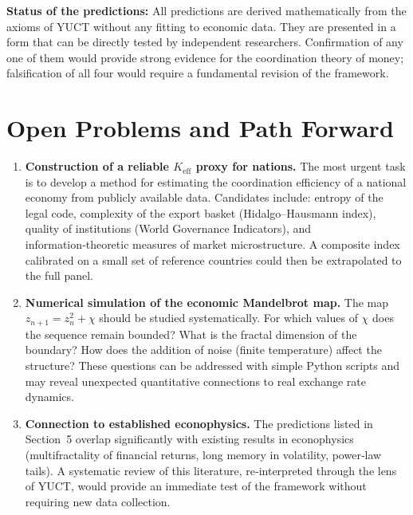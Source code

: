 \documentclass[12pt,a4paper]{article}
\theoremstyle{remark}
\begin{document}
	\textbf{Status of the predictions:} All predictions are derived mathematically from the axioms of YUCT without any fitting to economic data. They are presented in a form that can be directly tested by independent researchers. Confirmation of any one of them would provide strong evidence for the coordination theory of money; falsification of all four would require a fundamental revision of the framework.
	
	\section{Open Problems and Path Forward}
	
	\begin{enumerate}[label=(\roman*)]
		\item \textbf{Construction of a reliable \(K_{\mathrm{eff}}\) proxy for nations.} The most urgent task is to develop a method for estimating the coordination efficiency of a national economy from publicly available data. Candidates include: entropy of the legal code, complexity of the export basket (Hidalgo–Hausmann index), quality of institutions (World Governance Indicators), and information‑theoretic measures of market microstructure. A composite index calibrated on a small set of reference countries could then be extrapolated to the full panel.
		
		\item \textbf{Numerical simulation of the economic Mandelbrot map.} The map \(z_{n+1} = z_n^2 + \chi\) should be studied systematically. For which values of \(\chi\) does the sequence remain bounded? What is the fractal dimension of the boundary? How does the addition of noise (finite temperature) affect the structure? These questions can be addressed with simple Python scripts and may reveal unexpected quantitative connections to real exchange rate dynamics.
		
		\item \textbf{Connection to established econophysics.} The predictions listed in Section~5 overlap significantly with existing results in econophysics (multifractality of financial returns, long memory in volatility, power‑law tails). A systematic review of this literature, re‑interpreted through the lens of YUCT, would provide an immediate test of the framework without requiring new data collection.
	\end{enumerate}
	
\end{document}
